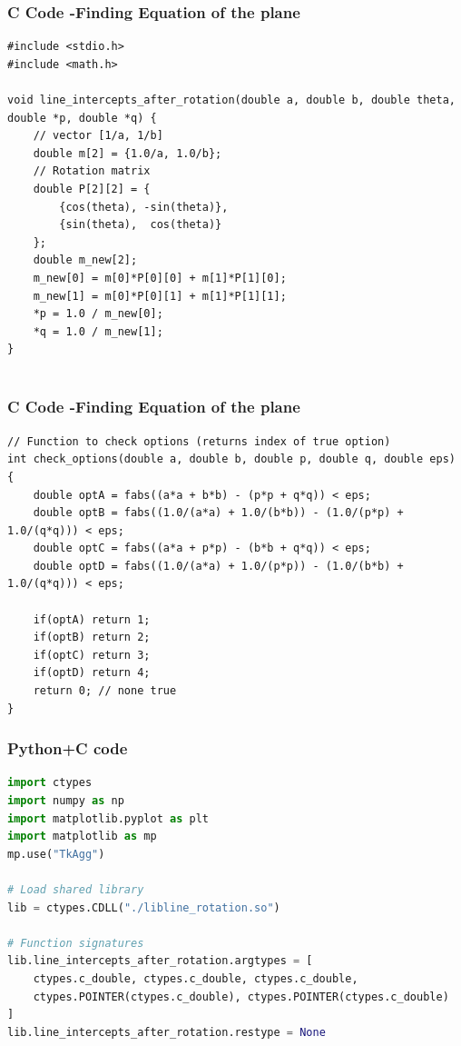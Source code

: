 \documentclass{beamer}
\begin{document}
\begin{frame}[fragile]
    \frametitle{C Code -Finding Equation of the plane}

    \begin{lstlisting}
#include <stdio.h>
#include <math.h>

void line_intercepts_after_rotation(double a, double b, double theta, double *p, double *q) {
    // vector [1/a, 1/b]
    double m[2] = {1.0/a, 1.0/b};
    // Rotation matrix
    double P[2][2] = {
        {cos(theta), -sin(theta)},
        {sin(theta),  cos(theta)}
    };
    double m_new[2];
    m_new[0] = m[0]*P[0][0] + m[1]*P[1][0];
    m_new[1] = m[0]*P[0][1] + m[1]*P[1][1];
    *p = 1.0 / m_new[0];
    *q = 1.0 / m_new[1];
}


    \end{lstlisting}
\end{frame}

\begin{frame}[fragile]
    \frametitle{C Code -Finding Equation of the plane}

    \begin{lstlisting}
// Function to check options (returns index of true option)
int check_options(double a, double b, double p, double q, double eps) {
    double optA = fabs((a*a + b*b) - (p*p + q*q)) < eps;
    double optB = fabs((1.0/(a*a) + 1.0/(b*b)) - (1.0/(p*p) + 1.0/(q*q))) < eps;
    double optC = fabs((a*a + p*p) - (b*b + q*q)) < eps;
    double optD = fabs((1.0/(a*a) + 1.0/(p*p)) - (1.0/(b*b) + 1.0/(q*q))) < eps;

    if(optA) return 1;
    if(optB) return 2;
    if(optC) return 3;
    if(optD) return 4;
    return 0; // none true
}

    \end{lstlisting}
\end{frame}

\begin{frame}[fragile]
    \frametitle{Python+C code}

    \begin{lstlisting}[language=Python]
import ctypes
import numpy as np
import matplotlib.pyplot as plt
import matplotlib as mp
mp.use("TkAgg")

# Load shared library
lib = ctypes.CDLL("./libline_rotation.so")

# Function signatures
lib.line_intercepts_after_rotation.argtypes = [
    ctypes.c_double, ctypes.c_double, ctypes.c_double,
    ctypes.POINTER(ctypes.c_double), ctypes.POINTER(ctypes.c_double)
]
lib.line_intercepts_after_rotation.restype = None


    \end{lstlisting}
\end{frame}
\end{document}
